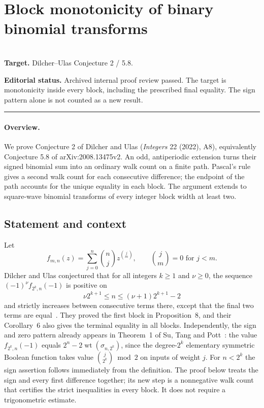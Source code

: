 \documentclass[11pt,a4paper]{article}
\begin{document}
\clearpage

\section{Block monotonicity of binary binomial transforms}
\label{section:R17M}
\\[3pt]
\noindent\textbf{Target.} Dilcher--Ulas Conjecture 2 / 5.8.

\noindent\textbf{Editorial status.} Archived internal proof review passed. The target is monotonicity inside every block, including the prescribed final equality. The sign pattern alone is not counted as a new result.

\smallskip\hrule\medskip



\begingroup
\newcommand{\Z}{\mathbb Z}
\setcounter{equation}{0}
\renewcommand{\theequation}{\thesection.\arabic{equation}}
\renewcommand{\theHequation}{R17M.\arabic{equation}}
\paragraph{Overview.}
We prove Conjecture 2 of Dilcher and Ulas (\emph{Integers} 22 (2022), A8), equivalently Conjecture 5.8 of arXiv:2008.13475v2. An odd, antiperiodic extension turns their signed binomial sum into an ordinary walk count on a finite path. Pascal's rule gives a second walk count for each consecutive difference; the endpoint of the path accounts for the unique equality in each block. The argument extends to square-wave binomial transforms of every integer block width at least two.


\subsection{Statement and context}
Let
\[
 f_{m,n}(z)=\sum_{j=0}^n\binom nj z^{\binom jm},\qquad
 \binom jm=0\text{ for }j<m .
\]
Dilcher and Ulas conjectured that for all integers \(k\ge1\) and \(\nu\ge0\), the sequence \((-1)^\nu f_{2^k,n}(-1)\) is positive on
\[
  \nu 2^{k+1}\le n\le (\nu+1)2^{k+1}-2
\]
and strictly increases between consecutive terms there, except that the final two terms are equal~\cite[p.~22, Conjecture~2]{R17M:DU}. They proved the first block in Proposition~8, and their Corollary~6 also gives the terminal equality in all blocks. Independently, the sign and zero pattern already appears in Theorem~1 of Su, Tang and Pott~\cite{R17M:STP}: the value \(f_{2^k,n}(-1)\) equals \(2^n-2\operatorname{wt}(\sigma_{n,2^k})\), since the degree-\(2^k\) elementary symmetric Boolean function takes value \(\binom j{2^k}\bmod 2\) on inputs of weight \(j\). For \(n<2^k\) the sign assertion follows immediately from the definition. The proof below treats the sign and every first difference together; its new step is a nonnegative walk count that certifies the strict inequalities in every block. It does not require a trigonometric estimate.
\end{document}
